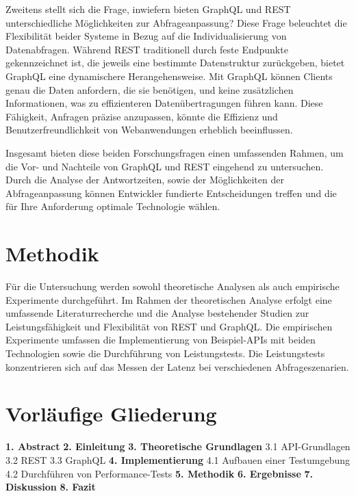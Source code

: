 \documentclass[a4paper, 12pt]{article}
\begin{document}
Zweitens stellt sich die Frage, inwiefern bieten GraphQL und REST unterschiedliche Möglichkeiten zur Abfrageanpassung? Diese Frage beleuchtet die Flexibilität beider Systeme in Bezug auf die Individualisierung von Datenabfragen. Während REST traditionell durch feste Endpunkte gekennzeichnet ist, die jeweils eine bestimmte Datenstruktur zurückgeben, bietet GraphQL eine dynamischere Herangehensweise. Mit GraphQL können Clients genau die Daten anfordern, die sie benötigen, und keine zusätzlichen Informationen, was zu effizienteren Datenübertragungen führen kann. Diese Fähigkeit, Anfragen präzise anzupassen, könnte die Effizienz und Benutzerfreundlichkeit von Webanwendungen erheblich beeinflussen.


Insgesamt bieten diese beiden Forschungsfragen einen umfassenden Rahmen, um die Vor- und Nachteile von GraphQL und REST eingehend zu untersuchen. Durch die Analyse der Antwortzeiten, sowie der Möglichkeiten der Abfrageanpassung können Entwickler fundierte Entscheidungen treffen und die für Ihre Anforderung optimale Technologie wählen.
\section{Methodik}
Für die Untersuchung werden sowohl theoretische Analysen als auch empirische Experimente durchgeführt. Im Rahmen der theoretischen Analyse erfolgt eine umfassende Literaturrecherche und die Analyse bestehender Studien zur Leistungsfähigkeit und Flexibilität von REST und GraphQL. Die empirischen Experimente umfassen die Implementierung von Beispiel-APIs mit beiden Technologien sowie die Durchführung von Leistungstests. Die Leistungstests konzentrieren sich auf das Messen der Latenz bei verschiedenen Abfrageszenarien.
\newpage
\section{Vorläufige Gliederung}
\textbf{1. Abstract}
\newline
\textbf{2. Einleitung}
\newline
\textbf{3. Theoretische Grundlagen}
\newline \hspace*{10mm}
3.1 API-Grundlagen
\newline \hspace*{10mm}
3.2 REST
\newline \hspace*{10mm}
3.3 GraphQL
\newline
\textbf{4. Implementierung}
\newline \hspace*{10mm}
4.1  Aufbauen einer Testumgebung
\newline \hspace*{10mm}
4.2 Durchführen von Performance-Tests
\newline
\textbf{5. Methodik}
\newline
\textbf{6. Ergebnisse}
\newline
\textbf{7. Diskussion}
\newline
\textbf{8. Fazit}
\end{document}
